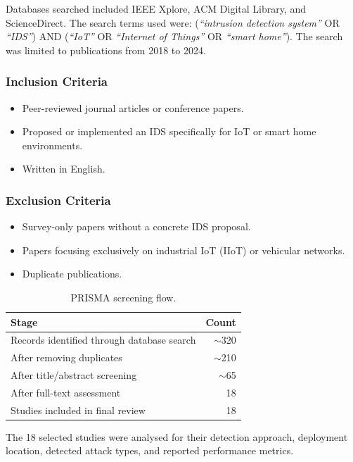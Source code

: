 \documentclass[12pt,a4paper]{article}
\begin{document}
Databases searched included IEEE Xplore, ACM Digital Library, and ScienceDirect. The search terms used were: (\emph{``intrusion detection system''} OR \emph{``IDS''}) AND (\emph{``IoT''} OR \emph{``Internet of Things''} OR \emph{``smart home''}). The search was limited to publications from 2018 to 2024.

\subsubsection*{Inclusion Criteria}
\begin{itemize}
    \item Peer-reviewed journal articles or conference papers.
    \item Proposed or implemented an IDS specifically for IoT or smart home environments.
    \item Written in English.
\end{itemize}

\subsubsection*{Exclusion Criteria}
\begin{itemize}
    \item Survey-only papers without a concrete IDS proposal.
    \item Papers focusing exclusively on industrial IoT (IIoT) or vehicular networks.
    \item Duplicate publications.
\end{itemize}

\begin{table}[H]
\centering
\caption{PRISMA screening flow.}
\label{tab:prisma}
\begin{tabular}{lr}
\toprule
\textbf{Stage} & \textbf{Count} \\
\midrule
Records identified through database search & $\sim$320 \\
After removing duplicates                  & $\sim$210 \\
After title/abstract screening             & $\sim$65 \\
After full-text assessment                 & 18 \\
Studies included in final review           & 18 \\
\bottomrule
\end{tabular}
\end{table}

The 18 selected studies were analysed for their detection approach, deployment location, detected attack types, and reported performance metrics.
\end{document}
